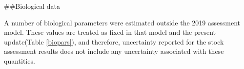 \documentclass[11pt,
  english,
  a4paper,
]{article}
\begin{document}
\leavevmode\tagmcend\tagstructend\par


\#\#Biological data

\leavevmode\tagmcend\tagstructend\par


A number of biological parameters were estimated outside the 2019 assessment model. These values are treated as fixed in that model and the present update(Table \ref{biopars}), and therefore, uncertainty reported for the stock assessment results does not include any uncertainty associated with these quantities.

\leavevmode\tagmcend\tagstructend\par
\end{document}
